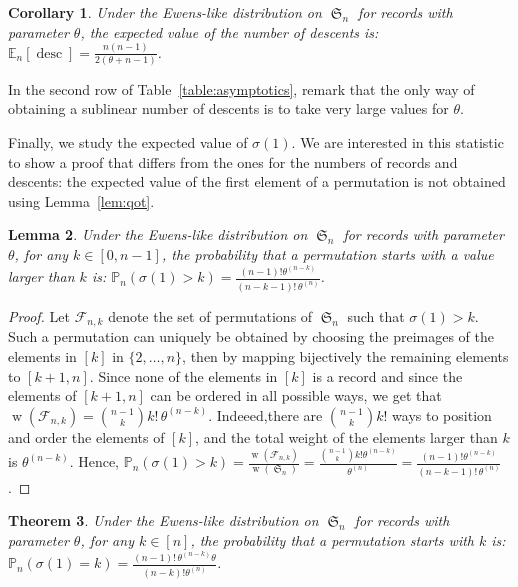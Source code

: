 \documentclass[proceedings]{aofa}
\newcommand{\F}{\mathcal{F}}
\newcommand{\EE}{\mathbb{E}}
\newcommand{\PP}{\mathbb{P}}
\DeclareMathOperator{\sym}{\mathfrak{S}}
\DeclareMathOperator{\weight}{w}
\DeclareMathOperator{\desc}{desc}
\newcommand{\rfact}[2]{#1^{(#2)}}
\newtheorem{theorem}{Theorem}
\newtheorem{lemma}[theorem]{Lemma}
\newtheorem{corollary}[theorem]{Corollary}
\begin{document}
\begin{corollary}\label{thm:nb_of_descents}
Under the Ewens-like distribution on $\sym_n$ for records with parameter $\theta$, the expected value of the number of descents is: 
$\EE_{n}[\desc]= \frac{n(n-1)}{2(\theta  + n-1)}$.
\end{corollary}
In the second row of Table~\ref{table:asymptotics}, remark that the only way of obtaining a sublinear number of descents is to take very large values for $\theta$.


\medskip

Finally, we study the expected value of $\sigma(1)$. 
We are interested in this statistic to show a proof that differs from the ones for
the numbers of records and descents: the expected value of the first element of a permutation is not obtained using Lemma~\ref{lem:qot}. 

\begin{lemma}\label{lem:first_value>k}
Under the Ewens-like distribution on $\sym_n$ for records with parameter $\theta$, 
for any $k \in [0,n-1]$, 
the probability that a permutation starts with a value larger than $k$ is: 
$\PP_{n}(\sigma(1)>k) = \frac{(n-1)!\rfact\theta{n-k}}{(n-k-1)!\,\rfact\theta n}$. 
\end{lemma}

\begin{proof}
Let $\F_{n,k}$ denote the set of permutations of $\sym_{n}$ such that $\sigma(1)>k$. 
Such a permutation can uniquely be obtained by choosing the preimages of the elements in $[k]$
in $\{2,\ldots,n\}$, then by mapping bijectively the remaining elements to
$[k+1,n]$. Since none of the elements in $[k]$ is a record and since
the elements of $[k+1,n]$ can be ordered in all possible ways, we get
that $\weight(\F_{n,k}) =\binom{n-1}{k}k!\,{\rfact \theta {n-k}}$. Indeeed,there are
$\binom{n-1}{k}k!$ ways to position and order the elements of $[k]$, and the total weight of the elements larger than $k$ is ${\rfact \theta {n-k}}$.
Hence, $\PP_{n}(\sigma(1)>k) =\frac{\weight(\F_{n,k})}{\weight(\sym_n)} =\frac{\binom{n-1}{k}k! \rfact \theta {n-k}}{\rfact{\theta}{n}} = \frac{(n-1)!\rfact\theta{n-k}}{(n-k-1)!\,\rfact\theta n}$.
\end{proof}


\begin{theorem}\label{cor:first_value=k}
Under the Ewens-like distribution on $\sym_n$ for records with parameter $\theta$, 
for any $k \in [n]$, 
the probability that a permutation starts with $k$ is: 
$\PP_{n}(\sigma(1)=k) = \frac{(n-1)!\,\rfact{\theta}{n-k}\theta}{(n-k)!\rfact{\theta}{n}}$.
\end{theorem}
\end{document}
